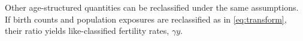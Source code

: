 \documentclass[12pt,oneside,a4paper,leqno]{article}
\newcommand{\ep}{\quad\quad\text{.}}
\begin{document}
Other age-structured quantities can be reclassified under the same assumptions.
If birth counts and population exposures are reclassified as in
\eqref{eq:transform}, their ratio yields like-classified fertility rates,
$\gamma{y}$.

%
%
\end{document}
